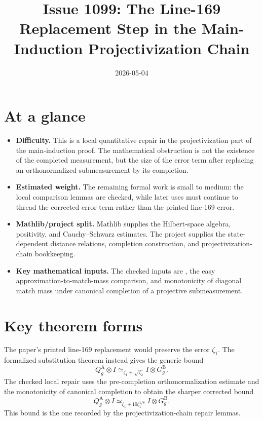 \documentclass[11pt]{article}
\title{Issue 1099: The Line-169 Replacement Step in the Main-Induction Projectivization Chain}
\author{}
\date{2026-05-04}
\begin{document}
\maketitle

\section{At a glance}

\begin{itemize}
\item \textbf{Difficulty.}  This is a local quantitative repair in the
  projectivization part of the main-induction proof.  The mathematical
  obstruction is not the existence of the completed measurement, but the size of
  the error term after replacing an orthonormalized submeasurement by its
  completion.
\item \textbf{Estimated weight.}  The remaining formal work is small to medium:
  the local comparison lemmas are checked, while later uses must continue to
  thread the corrected error term rather than the printed line-169 error.
\item \textbf{Mathlib/project split.}  Mathlib supplies the Hilbert-space
  algebra, positivity, and Cauchy--Schwarz estimates.  The project supplies the
  state-dependent distance relations, completion construction, and
  projectivization-chain bookkeeping.
\item \textbf{Key mathematical inputs.}  The checked inputs are
  , the easy approximation-to-match-mass comparison,
  and monotonicity of diagonal match mass under canonical completion of a
  projective submeasurement.
\end{itemize}

\section{Key theorem forms}

The paper's printed line-169 replacement would preserve the error
\(\zeta_1\).  The formalized substitution theorem instead gives the generic
bound
\[
  Q^{\mathrm A}_g \otimes I
  \simeq_{\zeta_1+\sqrt{\zeta_2}}
  I \otimes G^{\mathrm B}_g.
\]
The checked local repair uses the pre-completion orthonormalization estimate
and the monotonicity of canonical completion to obtain the sharper corrected
bound
\[
  Q^{\mathrm A}_g \otimes I
  \simeq_{\zeta_1+10\zeta_1^{1/8}}
  I \otimes G^{\mathrm B}_g.
\]
This bound is the one recorded by the projectivization-chain repair lemmas.
\end{document}

